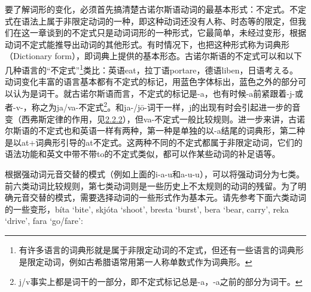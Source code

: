 要了解词形的变化，必须首先搞清楚古诺尔斯语动词的最基本形式：不定式。不定式在语法上属于非限定动词的一种，即这种动词还没有人称、时态等的限定，但我们在这一章谈到的不定式只是动词词形的一种形式，它最简单，未经过变形，根据动词不定式能推导出动词的其他形式。有时情况下，也把这种形式称为词典形（Dictionary
form），即词典上提供的基本形态。古诺尔斯语的不定式可以和以下几种语言的``不定式''\footnote{有许多语言的词典形就是属于非限定动词的不定式，但还有一些语言的词典形是限定动词，例如古希腊语常用第一人称单数式作为词典形。}类比：英语eat，拉丁语portare，德语liben，日语考える。动词变化丰富的语言基本都有不定式的标记，用蓝色字体标出，蓝色之外的部分可以认为是词干。就古诺尔斯语而言，不定式的标记是-a，也有时候-a前紧跟着-j-或者-v-，称之为ja/va-不定式\footnote{j/v事实上都是词干的一部分，即不定式标记总是-a，-a之前的部分为词干。}。和ja-/jō-词干一样，j的出现有时会引起进一步的音变（西弗斯定律的作用，见\hyperref[ajawa-ux8bcdux5e72]{2.2.2}），但va-不定式一般比较规则。进一步来讲，古诺尔斯语的不定式也和英语一样有两种，第一种是单独的以-a结尾的词典形，第二种是以at+词典形引导的at不定式。这两种不同的不定式都属于非限定动词，它们的语法功能和英文中带不带to的不定式类似，都可以作某些动词的补足语等。

根据强动词元音交替的模式（例如上面的i-a-u和a-u-u），可以将强动词分为七类。前六类动词比较规则，第七类动词则是一些历史上不太规则的动词的残留。为了明确元音交替的模式，需要选择动词的一些形式作为基本元。请先参考下面六类动词的一些变形，bíta
`bite', skjóta `shoot', bresta `burst', bera `bear, carry', reka
`drive‌', fara `go/fare‌':

